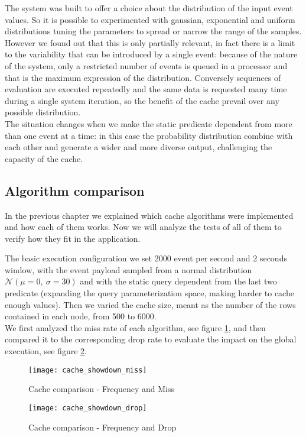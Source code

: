 The system was built to offer a choice about the distribution of the input event values. So it is possible to experimented with gaussian, exponential and uniform distributions tuning the parameters to spread or narrow the range of the samples.\\
However we found out that this is only partially relevant, in fact there is a limit to the variability that can be introduced by a single event: because of the nature of the system, only a restricted number of events is queued in a processor and that is the maximum expression of the distribution. Conversely sequences of evaluation are executed repeatedly and the same data is requested many time during a single system iteration, so the benefit of the cache prevail over any possible distribution.\\
The situation changes when we make the static predicate dependent from more than one event at a time: in this case the probability distribution combine with each other and generate a wider and more diverse output, challenging the capacity of the cache.

\subsection{Algorithm comparison}
In the previous chapter we explained which cache algorithms were implemented and how each of them works. Now we will analyze the tests of all of them to verify how they fit in the application.

The basic execution configuration we set 2000 event per second and 2 seconds window, with the event payload sampled from a normal distribution $\mathcal{N}(\mu = 0,\ \sigma = 30)$ and with the static query dependent from the last two predicate (expanding the query parameterization space, making harder to cache enough values). Then we varied the cache size, meant as the number of the rows contained in each node, from 500 to 6000.\\
We first analyzed the miss rate of each algorithm, see figure \ref{fig:cache_showdown_miss}, and then compared it to the corresponding drop rate to evaluate the impact on the global execution, see figure \ref{fig:cache_showdown_drop}.

\begin{figure}[h]
  \centering
  \texttt{[image: cache\_showdown\_miss]}
  \caption{Cache comparison - Frequency and Miss}
  \label{fig:cache_showdown_miss}
\end{figure}
\begin{figure}[h]
  \centering
  \texttt{[image: cache\_showdown\_drop]}
  \caption{Cache comparison - Frequency and Drop}
  \label{fig:cache_showdown_drop}
\end{figure}

